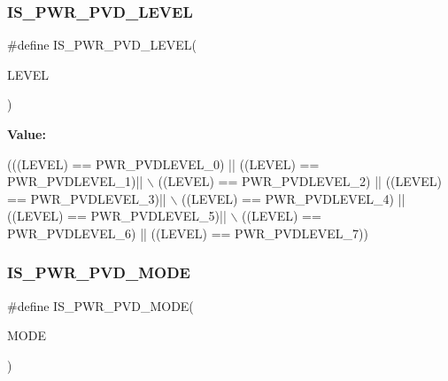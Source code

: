 \subsubsection{\texorpdfstring{I\+S\+\_\+\+P\+W\+R\+\_\+\+P\+V\+D\+\_\+\+L\+E\+V\+EL}{IS\_PWR\_PVD\_LEVEL}}
{\footnotesize\ttfamily \#define I\+S\+\_\+\+P\+W\+R\+\_\+\+P\+V\+D\+\_\+\+L\+E\+V\+EL(\begin{DoxyParamCaption}\item[{}]{L\+E\+V\+EL }\end{DoxyParamCaption})}

{\bfseries Value\+:}
\begin{DoxyCode}
(((LEVEL) == PWR\_PVDLEVEL\_0) || ((LEVEL) == PWR\_PVDLEVEL\_1)|| \(\backslash\)
                                 ((LEVEL) == PWR\_PVDLEVEL\_2) || ((LEVEL) == PWR\_PVDLEVEL\_3)|| \(\backslash\)
                                 ((LEVEL) == PWR\_PVDLEVEL\_4) || ((LEVEL) == PWR\_PVDLEVEL\_5)|| \(\backslash\)
                                 ((LEVEL) == PWR\_PVDLEVEL\_6) || ((LEVEL) == PWR\_PVDLEVEL\_7))
\end{DoxyCode}
\mbox{\label{group___p_w_r___i_s___p_w_r___definitions_ga8edfbbba20e58a9281408c23dc6ff7ef}} 
\subsubsection{\texorpdfstring{I\+S\+\_\+\+P\+W\+R\+\_\+\+P\+V\+D\+\_\+\+M\+O\+DE}{IS\_PWR\_PVD\_MODE}}
{\footnotesize\ttfamily \#define I\+S\+\_\+\+P\+W\+R\+\_\+\+P\+V\+D\+\_\+\+M\+O\+DE(\begin{DoxyParamCaption}\item[{}]{M\+O\+DE }\end{DoxyParamCaption})}

